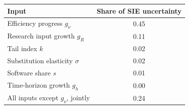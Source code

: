\begin{tabular}{@{}lc@{}}
\toprule
Input & Share of SIE uncertainty \\
\midrule
Efficiency progress $g_\nu$ & 0.45 \\
Research input growth $g_R$ & 0.11 \\
Tail index $k$ & 0.02 \\
Substitution elasticity $\sigma$ & 0.02 \\
Software share $s$ & 0.01 \\
Time-horizon growth $g_h$ & 0.00 \\
\midrule
All inputs except $g_\nu$, jointly & 0.24 \\
\bottomrule
\end{tabular}
